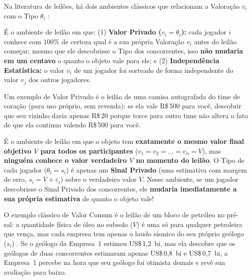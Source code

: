 Na literatura de leilões, há dois ambientes clássicos que relacionam a Valoração $v_i$ com o Tipo $\theta_i$ \cite[p.~13--14]{klemperer2004}:

\begin{definicao}
\label{def:ipv}
É o ambiente de leilão em que: (1) \textbf{Valor Privado ($v_i = \theta_i$):} cada jogador $i$ conhece com $100\%$ de certeza qual é a sua própria Valoração $v_i$ antes do leilão começar; mesmo que ele descobrisse o Tipo dos concorrentes, isso \textbf{não mudaria em um centavo} o quanto o objeto vale para ele; e (2) \textbf{Independência Estatística:} o valor $v_i$ de um jogador foi sorteado de forma independente do valor $v_j$ dos outros jogadores.
\end{definicao}

Um exemplo de Valor Privado é o leilão de uma camisa autografada do time de coração (para uso próprio, sem revenda): se ela vale R\$\,500 para você, descobrir que seu vizinho daria apenas R\$\,20 porque torce para outro time não altera o fato de que ela continua valendo R\$\,500 para você.

\begin{definicao}
\label{def:cv}
É o ambiente de leilão em que o objeto tem \textbf{exatamente o mesmo valor final objetivo $V$ para todos os participantes} ($v_1 = v_2 = \dots = v_n = V$), mas \textbf{ninguém conhece o valor verdadeiro $V$ no momento do leilão}. O Tipo de cada jogador ($\theta_i = s_i$) é apenas um \textbf{Sinal Privado} (uma estimativa com margem de erro, $s_i = V + \varepsilon_i$) sobre o verdadeiro valor $V$. Nesse ambiente, se um jogador descobrisse o Sinal Privado dos concorrentes, ele \textbf{mudaria imediatamente a sua própria estimativa} de quanto o objeto vale!
\end{definicao}

O exemplo clássico de Valor Comum é o leilão de um bloco de petróleo no pré-sal: a quantidade física de óleo no subsolo ($V$) é uma só para qualquer petroleira que vença, mas cada empresa tem apenas o laudo sísmico do seu próprio geólogo ($s_i$) \cite[p.~13--14]{klemperer2004}. Se o geólogo da Empresa~1 estimou US\$\,1,2~bi, mas ela descobre que os geólogos de duas concorrentes estimaram apenas US\$\,0,8~bi e US\$\,0,7~bi, a Empresa~1 percebe na hora que seu geólogo foi otimista demais e revê sua avaliação para baixo.

